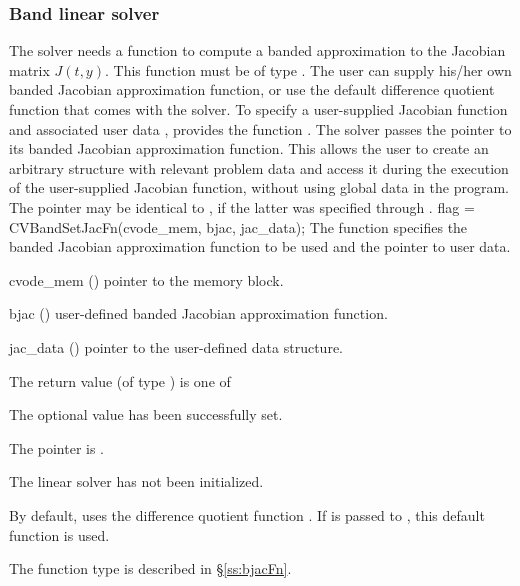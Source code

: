 \subsubsection{Band linear solver}\label{sss:optin_band}
The 
{\cvdense} solver needs a function to compute a banded approximation to
the Jacobian matrix $J(t,y)$.  This function must be of type . 
The user can supply his/her own banded Jacobian approximation function, 
or use the default difference quotient function  
that comes with the {\cvband} solver.
To specify a user-supplied Jacobian function  and associated user 
data , {\cvband} provides the function .
The {\cvband} solver passes the pointer 
to its banded Jacobian approximation function. This allows the user to
create an arbitrary structure with relevant problem data and access it
during the execution of the user-supplied Jacobian function, without
using global data in the program.  The pointer  may be
identical to , if the latter was specified through .
{
  flag = CVBandSetJacFn(cvode\_mem, bjac, jac\_data);
}
{
  The function  specifies the banded Jacobian
  approximation function to be used and the pointer to user data.
}
{
  \begin{args}
  \item[cvode\_mem] ()
    pointer to the {\cvode} memory block.
  \item[bjac] ()
    user-defined banded Jacobian approximation function.
  \item[jac\_data] ()
    pointer to the user-defined data structure.
  \end{args}
}
{
  The return value  (of type ) is one of
  \begin{args}
  \item[\Id{CVBAND\_SUCCESS}] 
    The optional value has been successfully set.
  \item[\Id{CVBAND\_MEM\_NULL}]
    The  pointer is .
  \item[\Id{CVBAND\_LMEM\_NULL}]
    The {\cvband} linear solver has not been initialized.
  \end{args}
}
{
  By default, {\cvband} uses the difference quotient function .
  If  is passed to , this default function is used.

  The function type  is described in \S\ref{ss:bjacFn}.
}

